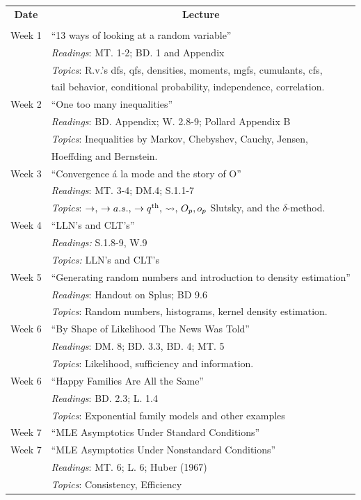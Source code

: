 \vspace{10mm}
\begin{tabular}{ll}
\multicolumn{1}{c}{\bf Date} &  \multicolumn{1}{c}{\bf Lecture} \\
 &  \\
Week 1 & ``13 ways of looking at a random variable''\\
& {\it Readings}: MT. 1-2; BD. 1 and Appendix \\
& {\it Topics}:  R.v.'s dfs, qfs, densities, moments, mgfs, cumulants, cfs, \\
&  tail behavior, conditional probability, independence, correlation.\\
Week 2 &  ``One too many inequalities''\\
& {\it Readings}: BD. Appendix; W. 2.8-9; Pollard Appendix B \\
& {\it Topics}:  Inequalities by Markov, Chebyshev, Cauchy, Jensen, \\
& Hoeffding and Bernstein. \\
Week 3 & ``Convergence \'{a} la mode and the story of O''\\
& {\it Readings}: MT. 3-4; DM.4; S.1.1-7 \\
& {\it Topics}: $\rightarrow, \, \rightarrow a.s., \, \rightarrow q^{\rm {th}}, \, \leadsto , \, O_p , o_p$  Slutsky, and the $\delta$-method. \\
Week 4 & ``LLN's and CLT's'' \\
& {\it Readings:} S.1.8-9, W.9 \\
& {\it Topics:} LLN's and CLT's \\
Week 5 & ``Generating random numbers and introduction to density estimation'' \\
& {\it Readings}: Handout on Splus; BD 9.6 \\
& {\it Topics}: Random numbers, histograms, kernel density estimation. \\
Week 6 & ``By Shape of Likelihood The News Was Told''\\
& {\it Readings}: DM. 8; BD. 3.3, BD. 4; MT. 5 \\
& {\it Topics}:  Likelihood, sufficiency and information.\\
Week 6 &  ``Happy Families Are All the Same''\\
& {\it Readings}: BD. 2.3; L. 1.4\\
& {\it Topics}:  Exponential family models and other examples\\
Week 7  & ``MLE Asymptotics Under Standard Conditions''\\
Week 7 & ``MLE Asymptotics Under Nonstandard Conditions''\\
& {\it Readings}: MT. 6; L. 6; Huber (1967)\\
& {\it Topics}:  Consistency, Efficiency\\
\end{tabular}

